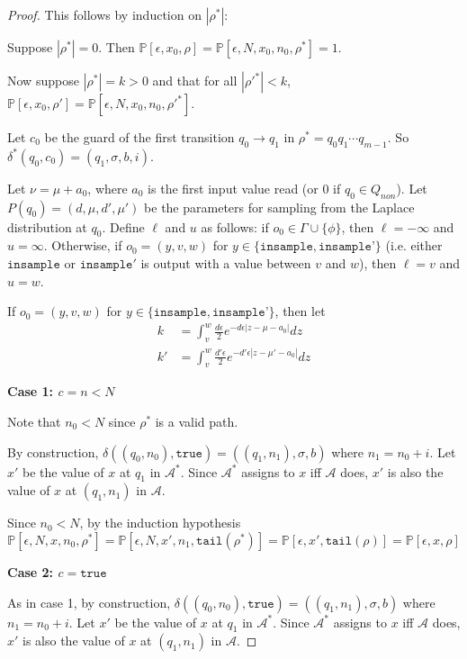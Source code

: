 \documentclass[12pt]{article}
\newcommand{\PP}{\mathbb{P}}
\theoremstyle{definition}
\begin{document}
\begin{proof}
	This follows by induction on $|\rho^*|$:

	Suppose $|\rho^*| = 0$. Then $\PP[\epsilon, x_0, \rho] = \PP[\epsilon, N, x_0, n_0, \rho^*] = 1$.

	Now suppose $|\rho^*| = k > 0$ and that for all $|\rho'^{*}|<k$, $\PP[\epsilon, x_0, \rho'] = \PP[\epsilon, N, x_0, n_0, \rho'^{*}]$.

	Let $c_0$ be the guard of the first transition $q_0 \to q_1$ in $\rho^* = q_0q_1\cdots q_{m-1}$. So $\delta^*(q_0, c_0) = (q_1, \sigma, b, i)$.

		
	Let $\nu = \mu + a_0$, where $a_0$ is the first input value read (or 0 if $q_0\in Q_{non}$). Let $P(q_0)= (d, \mu, d', \mu')$ be the parameters for sampling from the Laplace distribution at $q_0$. 
	Define $\ell$ and $u$ as follows: if $o_0 \in \Gamma\cup \{\phi\}$, then $\ell = -\infty$ and $u = \infty$. Otherwise, if $o_0 = (y, v, w)$ for $y \in \{\texttt{insample}, \texttt{insample'}\}$ (i.e. either $\texttt{insample}$ or $\texttt{insample}'$ is output with a value between $v$ and $w$), then $\ell = v$ and $u = w$.
	
	If $o_0 = (y, v, w)$ for $y\in \{\texttt{insample}, \texttt{insample'}\}$, then let \begin{align*}
		k &= \int_{v}^{w}\frac{d\epsilon}{2}e^{-d\epsilon|z-\mu-a_0|}dz\\
		k' &= \int_v^w\frac{d'\epsilon}{2}e^{-d'\epsilon|z-\mu'-a_0|}dz
	\end{align*}

	\textbf{Case 1: $c = n < N$}

	Note that $ n_0 < N$ since $\rho^*$ is a valid path.
	
	By construction, $\delta((q_0, n_0), \texttt{true}) = ((q_1, n_1), \sigma, b)$ where $n_1 = n_0 + i$. Let $x'$ be the value of $x$ at $q_1$ in $\mathcal{A}^*$. Since $\mathcal{A}^*$ assigns to $x$ iff $\mathcal{A}$ does, $x'$ is also the value of $x$ at $(q_1, n_1)$ in $\mathcal{A}$.

	Since $n_0 < N$, by the induction hypothesis
		\[
			\PP[\epsilon, N, x, n_0, \rho^*] = \PP[\epsilon, N, x', n_1, \texttt{tail}(\rho^*)] = \PP[\epsilon, x', \texttt{tail}(\rho)] = \PP[\epsilon, x, \rho]
		\]

	\textbf{Case 2: $c = \texttt{true}$}

	As in case 1, by construction, $\delta((q_0, n_0), \texttt{true}) = ((q_1, n_1), \sigma, b)$ where $n_1 = n_0 + i$. Let $x'$ be the value of $x$ at $q_1$ in $\mathcal{A}^*$. Since $\mathcal{A}^*$ assigns to $x$ iff $\mathcal{A}$ does, $x'$ is also the value of $x$ at $(q_1, n_1)$ in $\mathcal{A}$.


\end{proof}
\end{document}
